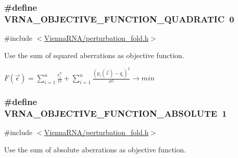 \subsubsection[{\texorpdfstring{V\+R\+N\+A\+\_\+\+O\+B\+J\+E\+C\+T\+I\+V\+E\+\_\+\+F\+U\+N\+C\+T\+I\+O\+N\+\_\+\+Q\+U\+A\+D\+R\+A\+T\+IC}{VRNA_OBJECTIVE_FUNCTION_QUADRATIC}}]{\setlength{\rightskip}{0pt plus 5cm}\#define V\+R\+N\+A\+\_\+\+O\+B\+J\+E\+C\+T\+I\+V\+E\+\_\+\+F\+U\+N\+C\+T\+I\+O\+N\+\_\+\+Q\+U\+A\+D\+R\+A\+T\+IC~0}\hypertarget{group__perturbation_ga81e10993d1ae728e4e02022b33155a12}{}\label{group__perturbation_ga81e10993d1ae728e4e02022b33155a12}


{\ttfamily \#include $<$\hyperlink{perturbation__fold_8h}{Vienna\+R\+N\+A/perturbation\+\_\+fold.\+h}$>$}



Use the sum of squared aberrations as objective function. 

$ F(\vec\epsilon) = \sum_{i = 1}^n{ \frac{\epsilon_i^2}{\tau^2} } + \sum_{i = 1}^n{ \frac{(p_i(\vec\epsilon) - q_i)^2}{\sigma^2} } \to min $ 
\subsubsection[{\texorpdfstring{V\+R\+N\+A\+\_\+\+O\+B\+J\+E\+C\+T\+I\+V\+E\+\_\+\+F\+U\+N\+C\+T\+I\+O\+N\+\_\+\+A\+B\+S\+O\+L\+U\+TE}{VRNA_OBJECTIVE_FUNCTION_ABSOLUTE}}]{\setlength{\rightskip}{0pt plus 5cm}\#define V\+R\+N\+A\+\_\+\+O\+B\+J\+E\+C\+T\+I\+V\+E\+\_\+\+F\+U\+N\+C\+T\+I\+O\+N\+\_\+\+A\+B\+S\+O\+L\+U\+TE~1}\hypertarget{group__perturbation_gac070dfb9cafaeb14d5652bd9adf0f6b1}{}\label{group__perturbation_gac070dfb9cafaeb14d5652bd9adf0f6b1}


{\ttfamily \#include $<$\hyperlink{perturbation__fold_8h}{Vienna\+R\+N\+A/perturbation\+\_\+fold.\+h}$>$}



Use the sum of absolute aberrations as objective function. 

